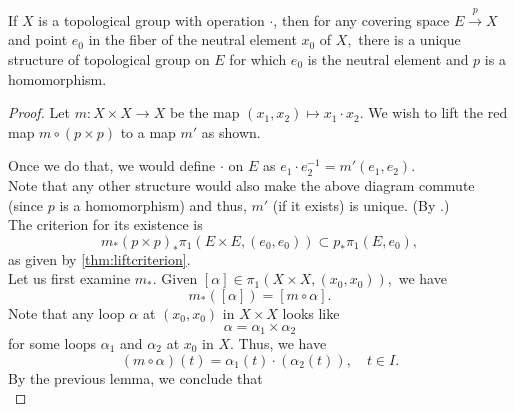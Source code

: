 \documentclass[12pt]{article}
\begin{document}
\begin{thm}
	If $X$ is a topological group with operation $\cdot$, then for any covering space $E \overset{p}{\longrightarrow} X$ and point $e_0$ in the fiber of the neutral element $x_0$ of $X,$ there is a unique structure of topological group on $E$ for which $e_0$ is the neutral element and $p$ is a homomorphism.
\end{thm}
\begin{proof} 
	Let $m:X\times X \to X$ be the map $(x_1, x_2) \mapsto x_1\cdot x_2.$ We wish to lift the red map $m\circ(p \times p)$ to a map $m'$ as shown.
	\begin{center}
	\end{center}
	Once we do that, we would define $\cdot$ on $E$ as $e_1\cdot e_2^{-1} = m'(e_1, e_2).$ \\
	Note that any other structure would also make the above diagram commute (since $p$ is a homomorphism) and thus, $m'$ (if it exists) is unique. (By .)\\
	The criterion for its existence is 
	\begin{equation*} 
		m_*(p \times p)_*\pi_1(E \times E, (e_0, e_0)) \subset p_*\pi_1(E, e_0),
	\end{equation*}
	as given by \cref{thm:liftcriterion}.\\
	Let us first examine $m_*.$ Given $[\alpha] \in \pi_1(X\times X, (x_0, x_0)),$ we have
	\begin{equation*} 
		m_*([\alpha]) = [m \circ \alpha].
	\end{equation*}
	Note that any loop $\alpha$ at $(x_0, x_0)$ in $X \times X$ looks like
	\begin{equation*} 
		\alpha = \alpha_1 \times \alpha_2
	\end{equation*}
	for some loops $\alpha_1$ and $\alpha_2$ at $x_0$ in $X.$ Thus, we have
	\begin{equation*} 
		(m\circ\alpha)(t) = \alpha_1(t)\cdot(\alpha_2(t)), \quad t \in I.	
	\end{equation*}
	By the previous lemma, we conclude that
	\begin{equation*} 

\end{equation*}
\end{proof}
\end{document}
